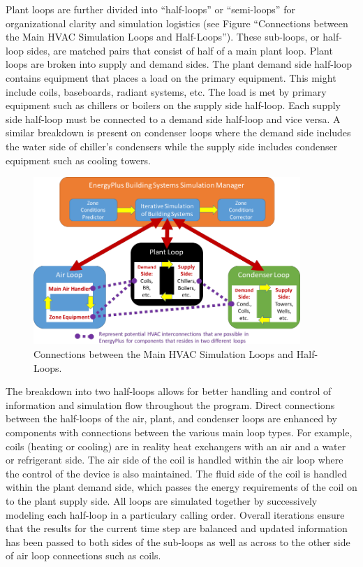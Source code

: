 Plant loops are further divided into ``half-loops'' or ``semi-loops'' for organizational clarity and simulation logistics (see Figure ``Connections between the Main HVAC Simulation Loops and Half-Loops''). These sub-loops, or half-loop sides, are matched pairs that consist of half of a main plant loop. Plant loops are broken into supply and demand sides. The plant demand side half-loop contains equipment that places a load on the primary equipment. This might include coils, baseboards, radiant systems, etc. The load is met by primary equipment such as chillers or boilers on the supply side half-loop. Each supply side half-loop must be connected to a demand side half-loop and vice versa. A similar breakdown is present on condenser loops where the demand side includes the water side of chiller's condensers while the supply side includes condenser equipment such as cooling towers.

\begin{figure}[hbtp] %
\centering
\includegraphics[width=0.9\textwidth, height=0.9\textheight, keepaspectratio=true]{media/image1957.svg.png}
\caption{Connections between the Main HVAC Simulation Loops and Half-Loops. \protect \label{fig:connections-between-the-main-hvac-simulation}}
\end{figure}

The breakdown into two half-loops allows for better handling and control of information and simulation flow throughout the program. Direct connections between the half-loops of the air, plant, and condenser loops are enhanced by components with connections between the various main loop types. For example, coils (heating or cooling) are in reality heat exchangers with an air and a water or refrigerant side. The air side of the coil is handled within the air loop where the control of the device is also maintained. The fluid side of the coil is handled within the plant demand side, which passes the energy requirements of the coil on to the plant supply side. All loops are simulated together by successively modeling each half-loop in a particulary calling order. Overall iterations ensure that the results for the current time step are balanced and updated information has been passed to both sides of the sub-loops as well as across to the other side of air loop connections such as coils.

